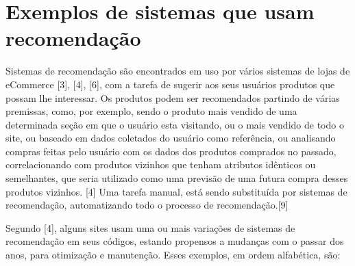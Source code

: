 \documentclass[12pt,
				openright,
				twoside,
				a4paper,
				apter=TITLE,
				section=TITLE,
				subsection=TITLE,
				chapter=TITLE,
				english,
				french,
				spanish,
				brazil]{abntex2}
\begin{document}
\section{Exemplos de sistemas que usam recomendação}
Sistemas de recomendação são encontrados em uso por vários sistemas de lojas de eCommerce [3], [4], [6], com a tarefa de sugerir aos seus usuários produtos que possam lhe interessar. Os produtos podem ser recomendados partindo de várias premissas, como, por exemplo, sendo o produto mais vendido de uma determinada seção em que o usuário esta visitando, ou o
mais vendido de todo o site, ou baseado em dados coletados do usuário como referência, ou analisando compras feitas pelo usuário com os dados dos produtos comprados no passado, correlacionando com produtos vizinhos que tenham atributos idênticos ou semelhantes, que seria utilizado como uma previsão de uma futura compra desses produtos vizinhos. [4] Uma
tarefa manual, está sendo substituída por sistemas de recomendação, automatizando todo o processo de recomendação.[9] 

Segundo [4], alguns sites usam uma ou mais variações de sistemas de recomendação em seus códigos, estando propensos a mudanças com o passar dos anos, para otimização e manutenção. Esses exemplos, em ordem alfabética, são: 
\end{document}
